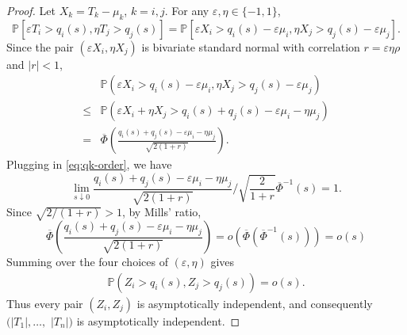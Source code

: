 \documentclass[12pt]{article}
\theoremstyle{plain}
\theoremstyle{plain}
\theoremstyle{definition}
\renewcommand{\Pr}{\mathbb{P}}
\begin{document}
\begin{proof}
Let $X_k=T_k-\mu_k$, $k=i,j$. For any $\varepsilon,\eta\in\{-1,1\}$,
\[
\Pr\left[\varepsilon T_i>q_i(s),\eta T_j>q_j(s)\right]
=
\Pr\left[\varepsilon X_i>q_i(s)-\varepsilon\mu_i,\eta X_j>q_j(s)-\varepsilon\mu_j\right].
\]
Since the pair $\left(\varepsilon X_i,\eta X_j\right)$ is bivariate standard normal with correlation
$r=\varepsilon\eta\rho$ and $|r|<1$,
\begin{align*}
&\Pr(\varepsilon X_i > q_i(s)-\varepsilon\mu_i,\eta X_j > q_j(s)-\varepsilon\mu_j)\\
\le&\Pr(\varepsilon X_i+\eta X_j > q_i(s)+q_j(s)-\varepsilon\mu_i-\eta\mu_j)\\
=&\overline{\Phi}\left(\frac{q_i(s)+q_j(s)-\varepsilon\mu_i-\eta\mu_j}{\sqrt{2(1+r)}}\right). 
\end{align*}
Plugging in \eqref{eq:qk-order}, we have
\[
\lim_{s\downarrow0}
\frac{q_i(s)+q_j(s)-\varepsilon\mu_i-\eta\mu_j}{\sqrt{2(1+r)}} 
\bigg/\sqrt{\frac{2}{1+r}}\overline{\Phi}^{-1}(s)
=1.
\]
Since $\sqrt{2/(1+r)}>1$, by Mills' ratio,
\[
\overline{\Phi}\left(\frac{q_i(s)+q_j(s)-\varepsilon\mu_i-\eta\mu_j}{\sqrt{2(1+r)}}\right)
=o\left(\overline{\Phi}\left(\overline{\Phi}^{-1}(s)\right)\right)
=o(s)
\]
Summing over the four choices of \((\varepsilon,\eta)\) gives
\begin{align*}
\Pr\left(Z_i>q_i(s),Z_j>q_j(s)\right)=o(s).
\end{align*}
Thus every pair $(Z_i,Z_j)$ is asymptotically independent, and consequently $(|T_1|,\dots,$ $|T_n|)$ is asymptotically independent.
\end{proof}
\end{document}
